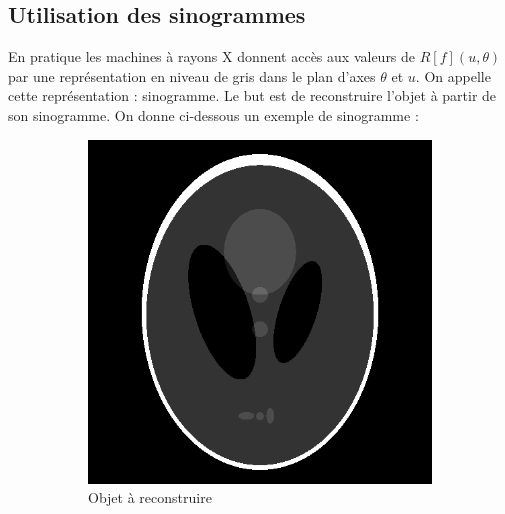 \documentclass{article}
\theoremstyle{definition}
\theoremstyle{remark}
\theoremstyle{plain}
\theoremstyle{definition}
\begin{document}
\subsection{Utilisation des sinogrammes}
En pratique les machines à rayons X donnent accès aux valeurs de $R[f](u,\theta)$ par une représentation en niveau de gris dans le plan d'axes $\theta$ et $u$.
On appelle cette représentation : sinogramme. Le but est de reconstruire l'objet à partir de son sinogramme. On donne ci-dessous un exemple de sinogramme : 
\begin{figure}[h]
    \centering
    \begin{subfigure}{0.3\textwidth}
        \includegraphics[width=\textwidth]{original.png}
        \caption{Objet à reconstruire}
    \end{subfigure}
    \qquad \qquad 
    \begin{subfigure}{0.17\textwidth}

\end{subfigure}
\end{figure}
\end{document}
